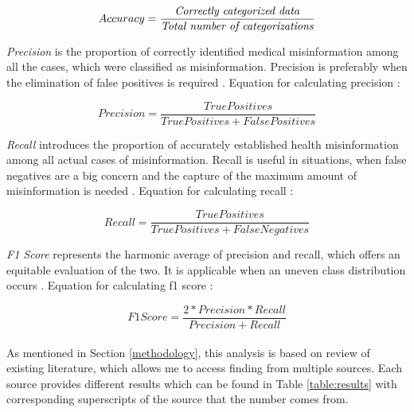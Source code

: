 \documentclass[11pt ,english,a4paper]{article}
\begin{document}
\begin{equation}
Accuracy = \frac{\text{\emph{Correctly categorized data}}}{\text{\emph{Total number of categorizations}}}
\end{equation}

\emph{Precision} is the proportion of correctly identified medical misinformation among all the cases, which were classified as misinformation. Precision is preferably when the elimination of false positives is required \cite{aph18detect}. Equation for calculating precision \cite{sha20mach}:

\begin{equation}
Precision = \frac{True Positives}{True Positives + False Positives}
\end{equation}

\emph{Recall} introduces the proportion of accurately established health misinformation among all actual cases of misinformation. Recall is useful in situations, when false negatives are a big concern and the capture of the maximum amount of misinformation is needed \cite{aph18detect}. Equation for calculating recall \cite{sha20mach}:

\begin{equation}
Recall = \frac{True Positives}{True Positives + False Negatives}
\end{equation}

\emph{F1 Score} represents the harmonic average of precision and recall, which offers an equitable evaluation of the two. It is applicable when an uneven class distribution occurs \cite{aph18detect}. Equation for calculating f1 score \cite{sha20mach}:

\begin{equation}
F1 Score = \frac{2*Precision*Recall}{Precision + Recall}
\end{equation}

\paragraph{} As mentioned in Section \ref{methodology}, this analysis is based on review of existing literature, which allows me to access finding from multiple sources. Each source provides different results which can be found in Table \ref{table:results} with corresponding superscripts of the source that the number comes from. 
\end{document}
